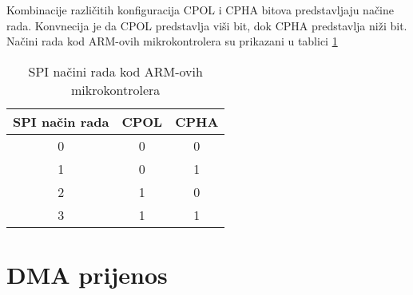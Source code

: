 Kombinacije različitih konfiguracija CPOL i CPHA bitova predstavljaju načine rada. Konvnecija je da CPOL predstavlja viši bit, dok CPHA predstavlja niži bit. Načini rada kod ARM-ovih mikrokontrolera su prikazani u tablici \ref{Tab:spi_modes}
\begin{center}
	\begin{table}[H]
		\centering
		\begin{tabular}{| c | c | c |}
			\hline
			SPI način rada & CPOL & CPHA \\
			\hline
			0 & 0 & 0 \\
			\hline
			1 & 0 & 1 \\
			\hline
			2 & 1 & 0 \\
			\hline
			3 & 1 & 1 \\
			\hline
		\end{tabular}
		\caption{SPI načini rada kod ARM-ovih mikrokontrolera \cite{spi_wikipedia}}
		\label{Tab:spi_modes}
	\end{table}
\end{center}

\section{DMA prijenos}